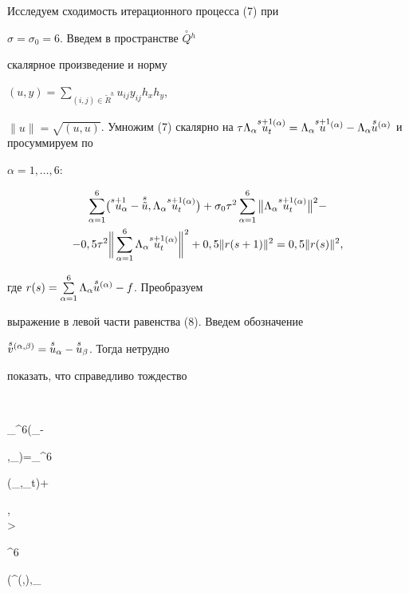 Исследуем сходимость итерационного процесса (7) при


$\sigma=\sigma_0=6$. Введем в пространстве $\overset{\circ}{Q}{}^h$


скалярное произведение и норму


$(u,y)=\sum\limits_{(i,j)\in\widetilde R^h}u_{ij}y_{ij}h_xh_y$,


$\|u\|=\sqrt{(u,u)}$. Умножим (7) скалярно на $\tau\Lambda_\alpha


\ussat=\Lambda_\alpha\ussa-\Lambda_\alpha\usva$ и просуммируем по


$\alpha=1,\dotsc,6$:


\begin{multline}


\sum_{\alpha=1}^6\bigl(\overset{s+1}{u}_{\!\!\!\alpha}-


\overset{s}{\tilde u},\Lambda_\alpha\ussat\bigr)+\sigma_0\tau^2


\sum_{\alpha=1}^6\big\|\Lambda_\alpha\ussat\big\|^2- \\


%


-0,5\tau^2\bigg\|


\sum_{\alpha=1}^6\Lambda_\alpha\ussat\bigg\|^2+0,5\|r(s+1)\|^2=


0,5\|r(s)\|^2,


\end{multline}


где $r(s)=\sum\limits_{\alpha=1}^6\Lambda_\alpha{\overset{s}{u}{}^{(\alpha)}}-f$. Преобразуем


выражение в левой части равенства (8). Введем обозначение


$\overset{s}{v}{}^{(\alpha,\beta)}={\overset{s}{u}_{\alpha}}-{\overset{s}{u}_{\beta}}$. Тогда нетрудно


показать, что справедливо тождество


$$


\sum_{}^6\bigl(_{\!\!\!\alpha}-


,\Lambda_\alpha\ussat\bigr)=\tau\sum_{}^6


\bigl(\Lambda_\alpha\ussat,_{\!\!\!\alpha t}\bigr)+


\sum \begin{Sb} \alpha,\\ 


\alpha>\beta \end{Sb}^6


\bigl(^{(\alpha,\beta)},\Lambda_\alpha


